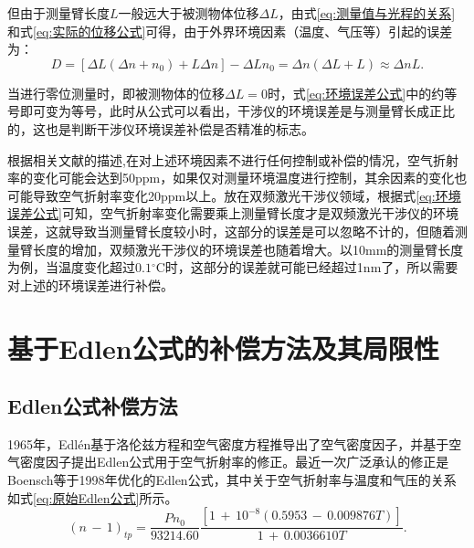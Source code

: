 但由于测量臂长度\(L\)一般远大于被测物体位移\(\Delta L\)，由式\eqref{eq:测量值与光程的关系}和式\eqref{eq:实际的位移公式}可得，由于外界环境因素（温度、气压等）引起的误差为：
\begin{equation}\label{eq:环境误差公式}
    D=[\Delta L(\Delta n+n_0)+L\Delta n]-\Delta Ln_0=\Delta n(\Delta L+L) \approx \Delta n L.
\end{equation}

当进行零位测量时，即被测物体的位移$\Delta L = 0$时，式\eqref{eq:环境误差公式}中的约等号即可变为等号，此时从公式可以看出，干涉仪的环境误差是与测量臂长成正比的，这也是判断干涉仪环境误差补偿是否精准的标志。

根据相关文献的描述\cite{徐建2013双频激光干涉仪系统线性测量误差主要来源及减小误差的方法分析},在对上述环境因素不进行任何控制或补偿的情况，空气折射率的变化可能会达到50ppm，如果仅对测量环境温度进行控制，其余因素的变化也可能导致空气折射率变化20ppm以上。放在双频激光干涉仪领域，根据式\eqref{eq:环境误差公式}可知，空气折射率变化需要乘上测量臂长度才是双频激光干涉仪的环境误差，这就导致当测量臂长度较小时，这部分的误差是可以忽略不计的，但随着测量臂长度的增加，双频激光干涉仪的环境误差也随着增大。以10mm的测量臂长度为例，当温度变化超过\(0.1\)$^{\circ} \mathrm{C}$时，这部分的误差就可能已经超过1nm了，所以需要对上述的环境误差进行补偿。

\section{基于Edlen公式的补偿方法及其局限性}
\subsection{Edlen公式补偿方法}
1965年，Edlén基于洛伦兹方程和空气密度方程推导出了空气密度因子，并基于空气密度因子提出Edlen公式用于空气折射率的修正\cite{2015Refractive}。最近一次广泛承认的修正是Boensch等\cite{1998Fit}于1998年优化的Edlen公式，其中关于空气折射率与温度和气压的关系如式\eqref{eq:原始Edlen公式}所示。
    \begin{equation}\label{eq:原始Edlen公式}
    (n\,-\,1)_{tp}=\frac{Pn_0}{93214.60}\frac{[1\,+\,10^{-8}(0.5953\,-\,0.009876T)]}{1\,+\,0.0036610T}.
    \end{equation}

